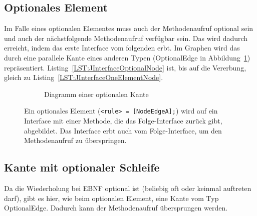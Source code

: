 \documentclass[../InterneDSLs.tex]{subfiles}
\begin{document}
\subsection{Optionales Element}\label{SEC:Optional}
Im Falle eines optionalen Elementes muss auch der Methodenaufruf optional sein und auch der nächstfolgende Methodenaufruf verfügbar sein. Das wird dadurch erreicht, indem das erste Interface vom folgenden erbt. Im Graphen wird das durch eine parallele Kante eines anderen Typen (OptionalEdge in Abbildung~\ref{FIG:DiagramOptionalNode}) repräsentiert. Listing~\ref{LST:JInterfaceOptionalNode} ist, bis auf die Vererbung, gleich zu Listing~\ref{LST:JInterfaceOneElementNode}.
\begin{figure}[ht]
\centering
  \begin{subfigure}[c]{0.49\textwidth}
    \caption{Diagramm einer optionalen Kante}
    \label{FIG:DiagramOptionalNode}
  \end{subfigure}
  \begin{subfigure}[c]{0.49\textwidth}
    
  \end{subfigure}
  \caption[Abbildung eines optionalen Elements (\texttt{<rule> = [NodeEdgeA];})]{Ein optionales Element (\texttt{<rule> = [NodeEdgeA];}) wird auf ein Interface mit einer Methode, die das Folge-Interface zurück gibt, abgebildet. Das Interface erbt auch vom Folge-Interface, um den Methodenaufruf zu überspringen.}
  \label{FIG:OptionalNode}
\end{figure}

\subsection{Kante mit optionaler Schleife}\label{SEC:OptionalLoop}
Da die Wiederholung bei EBNF optional ist (beliebig oft oder keinmal auftreten darf), gibt es hier, wie beim optionalen Element, eine Kante vom Typ OptionalEdge. Dadurch kann der Methodenaufruf übersprungen werden.
\end{document}
